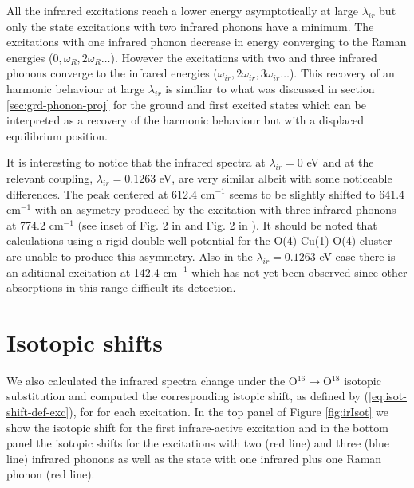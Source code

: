 All the infrared excitations reach a lower energy asymptotically at large $\lambda_{ir}$ but only the state excitations with two infrared phonons have a minimum.
The excitations with one infrared phonon decrease in energy converging to the Raman energies ($0,\omega_R,2\omega_R\ldots$).
However the excitations with two and three infrared phonons converge to the infrared energies ($\omega_{ir},2\omega_{ir},3\omega_{ir}\ldots$).
This recovery of an harmonic behaviour at large $\lambda_{ir}$ is similiar to what was discussed in section \ref{sec:grd-phonon-proj} for the ground and first excited states which can be interpreted as a recovery of the harmonic behaviour but with a displaced equilibrium position.

It is interesting to notice that the infrared spectra at $\lambda_{ir}=0$ eV and at the relevant coupling, $\lambda_{ir}=0.1263$ eV, are very similar albeit with some noticeable differences.
The peak centered at 612.4 cm$^{-1}$ seems to be slightly shifted to 641.4 cm$^{-1}$ with an asymetry produced by the excitation with three infrared phonons at 774.2 cm$^{-1}$ (see inset of Fig. 2 in \cite{MustredeLeon1992} and Fig. 2 in \cite{Salkola1994}).
It should be noted that calculations using a rigid double-well potential for the O(4)-Cu(1)-O(4) cluster are unable to produce this asymmetry.
Also in the $\lambda_{ir}=0.1263$ eV case there is an aditional excitation at 142.4 cm$^{-1}$ which has not yet been observed since other absorptions in this range difficult its detection.

\section{Isotopic shifts}
\label{sec:irIsotopicShifts}

We also calculated the infrared spectra change under the O$^{16}\rightarrow$O$^{18}$ isotopic substitution and computed the corresponding istopic shift, as defined by (\ref{eq:isot-shift-def-exc}), for for each excitation.
In the top panel of Figure \ref{fig:irIsot} we show the isotopic shift for the first infrare-active excitation and in the bottom panel the isotopic shifts for the excitations with two (red line) and three (blue line) infrared phonons as well as the state with one infrared plus one Raman phonon (red line).

